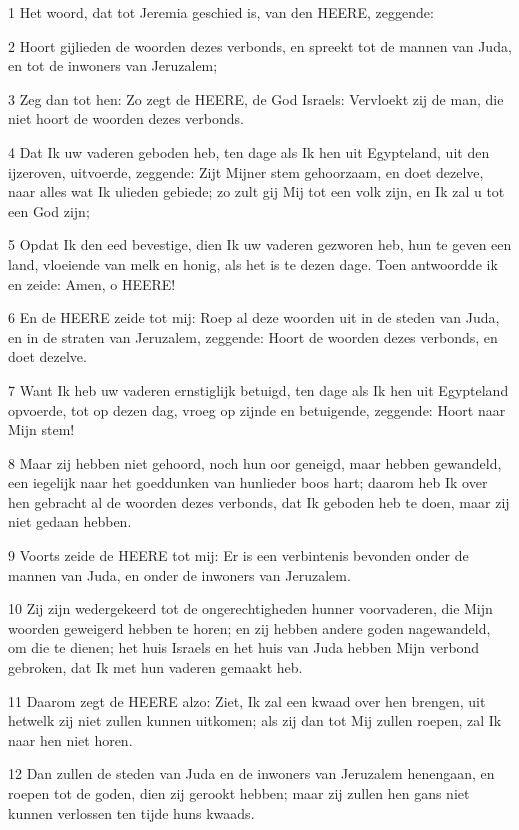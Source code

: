 \par 1 Het woord, dat tot Jeremia geschied is, van den HEERE, zeggende:
\par 2 Hoort gijlieden de woorden dezes verbonds, en spreekt tot de mannen van Juda, en tot de inwoners van Jeruzalem;
\par 3 Zeg dan tot hen: Zo zegt de HEERE, de God Israels: Vervloekt zij de man, die niet hoort de woorden dezes verbonds.
\par 4 Dat Ik uw vaderen geboden heb, ten dage als Ik hen uit Egypteland, uit den ijzeroven, uitvoerde, zeggende: Zijt Mijner stem gehoorzaam, en doet dezelve, naar alles wat Ik ulieden gebiede; zo zult gij Mij tot een volk zijn, en Ik zal u tot een God zijn;
\par 5 Opdat Ik den eed bevestige, dien Ik uw vaderen gezworen heb, hun te geven een land, vloeiende van melk en honig, als het is te dezen dage. Toen antwoordde ik en zeide: Amen, o HEERE!
\par 6 En de HEERE zeide tot mij: Roep al deze woorden uit in de steden van Juda, en in de straten van Jeruzalem, zeggende: Hoort de woorden dezes verbonds, en doet dezelve.
\par 7 Want Ik heb uw vaderen ernstiglijk betuigd, ten dage als Ik hen uit Egypteland opvoerde, tot op dezen dag, vroeg op zijnde en betuigende, zeggende: Hoort naar Mijn stem!
\par 8 Maar zij hebben niet gehoord, noch hun oor geneigd, maar hebben gewandeld, een iegelijk naar het goeddunken van hunlieder boos hart; daarom heb Ik over hen gebracht al de woorden dezes verbonds, dat Ik geboden heb te doen, maar zij niet gedaan hebben.
\par 9 Voorts zeide de HEERE tot mij: Er is een verbintenis bevonden onder de mannen van Juda, en onder de inwoners van Jeruzalem.
\par 10 Zij zijn wedergekeerd tot de ongerechtigheden hunner voorvaderen, die Mijn woorden geweigerd hebben te horen; en zij hebben andere goden nagewandeld, om die te dienen; het huis Israels en het huis van Juda hebben Mijn verbond gebroken, dat Ik met hun vaderen gemaakt heb.
\par 11 Daarom zegt de HEERE alzo: Ziet, Ik zal een kwaad over hen brengen, uit hetwelk zij niet zullen kunnen uitkomen; als zij dan tot Mij zullen roepen, zal Ik naar hen niet horen.
\par 12 Dan zullen de steden van Juda en de inwoners van Jeruzalem henengaan, en roepen tot de goden, dien zij gerookt hebben; maar zij zullen hen gans niet kunnen verlossen ten tijde huns kwaads.
